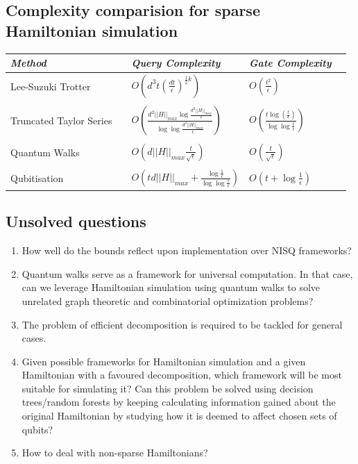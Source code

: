 \documentclass[
10pt, %
a4paper, %
oneside, %
headinclude,footinclude, %
BCOR5mm, %
]{scrartcl}
\begin{document}
\subsection{Complexity comparision for sparse Hamiltonian simulation}
\begin{center}
\begin{tabular}{ *5l }   \toprule
\emph{Method} && \emph{Query Complexity} & \emph{Gate Complexity}  \\\midrule
Lee-Suzuki Trotter && $O\left(d^{3}t\left({\frac {dt}{\epsilon }}\right)^{{\frac {1}{2}}k}\right)$  & $O\left({\frac {t^{2}}{\epsilon }}\right)$\\ \\ 
Truncated Taylor Series && $O\left({\frac {d^{2}||H||_{max}\log {\frac {d^{2}||H||_{max}}{\epsilon }}}{\log \log {\frac {d^{2}||H||_{max}}{\epsilon }}}}\right)$ & $O\left({\frac {t\log\left({\frac {t}{\epsilon }}\right)}{\log \log {\frac {t}{\epsilon }}}}\right)$\\ \\
Quantum Walks && $O\left(d||H||_{max}{\frac {t}{\sqrt {\epsilon }}}\right)$ & $O\left({\frac {t}{\sqrt {\epsilon }}}\right)$\\ \\
Qubitisation && $O\left(td||H||_{max}+{\frac {\log {\frac {1}{\epsilon }}}{\log \log {\frac {1}{\epsilon }}}}\right)$ & $O\left(t+\log {\frac {1}{\epsilon }}\right)$\\
\bottomrule
\hline
\end{tabular}
\end{center}

\subsection{Unsolved questions}
\begin{enumerate}
    \item How well do the bounds reflect upon implementation over NISQ frameworks?
    \item Quantum walks serve as a framework for universal computation. In that case, can we leverage Hamiltonian simulation using quantum walks to solve unrelated graph theoretic and combinatorial optimization problems?
    \item The problem of efficient decomposition is required to be tackled for general cases.
    \item Given possible frameworks for Hamiltonian simulation and a given Hamiltonian with a favoured decomposition, which framework will be most suitable for simulating it? Can this problem be solved using decision trees/random forests by keeping calculating information gained about the original Hamiltonian by studying how it is deemed to affect chosen sets of qubits?
    \item How to deal with non-sparse Hamiltonians?
\end{enumerate}
\end{document}

